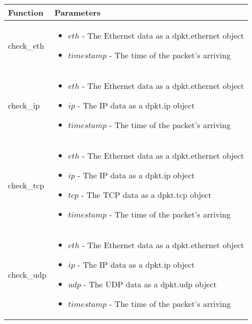 \documentclass[a4paper, 11pt]{article}
\begin{document}
                \begin{tabular}{|l|p{}|}
                    \hline
                    Function & Parameters\\
                    \hline
                    \hline
                    check\_eth &    \begin{itemize}
                                        \item $eth$ - The Ethernet data as a dpkt.ethernet object
                                        \item $timestamp$ - The time of the packet's arriving
                                    \end{itemize}\\
                    \hline
                    check\_ip &     \begin{itemize}
                                        \item $eth$ - The Ethernet data as a dpkt.ethernet object
                                        \item $ip$ - The IP data as a dpkt.ip object
                                        \item $timestamp$ - The time of the packet's arriving
                                    \end{itemize}\\
                    \hline
                    check\_tcp &    \begin{itemize}
                                        \item $eth$ - The Ethernet data as a dpkt.ethernet object
                                        \item $ip$ - The IP data as a dpkt.ip object
                                        \item $tcp$ - The TCP data as a dpkt.tcp object
                                        \item $timestamp$ - The time of the packet's arriving
                                    \end{itemize}\\
                    \hline
                    check\_udp &    \begin{itemize}
                                        \item $eth$ - The Ethernet data as a dpkt.ethernet object
                                        \item $ip$ - The IP data as a dpkt.ip object
                                        \item $udp$ - The UDP data as a dpkt.udp object
                                        \item $timestamp$ - The time of the packet's arriving
                                    \end{itemize}\\
                    \hline
                \end{tabular}
                
\end{document}
